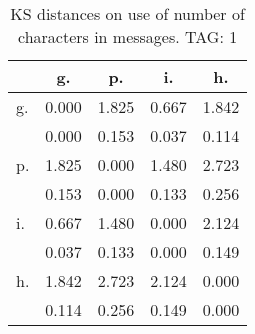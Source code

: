 \begin{table}[h!]
\begin{center}
\begin{tabular}{| l | c | c | c | c |}\hline
 & g. & p. & i. & h. \\\hline
g. & 0.000  & 1.825  & 0.667  & 1.842 \\\hline
 & 0.000  & 0.153  & 0.037  & 0.114 \\\hline
p. & 1.825  & 0.000  & 1.480  & 2.723 \\\hline
 & 0.153  & 0.000  & 0.133  & 0.256 \\\hline
i. & 0.667  & 1.480  & 0.000  & 2.124 \\\hline
 & 0.037  & 0.133  & 0.000  & 0.149 \\\hline
h. & 1.842  & 2.723  & 2.124  & 0.000 \\\hline
 & 0.114  & 0.256  & 0.149  & 0.000 \\\hline
\end{tabular}
\caption{KS distances on use of number of characters in messages. TAG: 1}
\end{center}
\end{table}